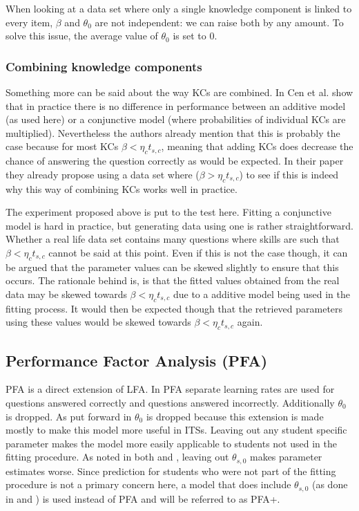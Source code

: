 \documentclass{scrartcl}
\begin{document}
When looking at a data set where only a single knowledge component is linked to every item, $\beta$ and $\theta_{0}$ are not independent: we can raise both by any amount. To solve this issue, the average value of $\theta_{0}$ is set to 0.
\subsubsection{Combining knowledge components}
\label{sec:comb}
Something more can be said about the way KCs are combined. In \cite{skillcombi} Cen et al. show that in practice there is no difference in performance between an additive model (as used here) or a conjunctive model (where probabilities of individual KCs are multiplied). Nevertheless the authors already mention that this is probably the case because for most KCs $\beta < \eta_{c} t_{s,c}$, meaning that adding KCs does decrease the chance of answering the question correctly as would be expected. In their paper they already propose using a data set where ($\beta > \eta_{c} t_{s,c}$) to see if this is indeed why this way of combining KCs works well in practice.

The experiment proposed above is put to the test here. Fitting a conjunctive model is hard in practice, but generating data using one is rather straightforward. Whether a real life data set contains many questions where skills are such that $\beta < \eta_{c} t_{s,c}$ cannot be said at this point. Even if this is not the case though, it can be argued that the parameter values can be skewed slightly to ensure that this occurs. The rationale behind is, is that the fitted values obtained from the real data may be skewed towards $\beta < \eta_{c} t_{s,c}$ due to a additive model being used in the fitting process. It would then be expected though that the retrieved parameters using these values would be skewed towards $\beta < \eta_{c} t_{s,c}$ again.

\subsection{Performance Factor Analysis (PFA)}
PFA is a direct extension of LFA. In PFA separate learning rates are used for questions answered correctly and questions answered incorrectly. Additionally $\theta_{0}$ is dropped. As put forward in \cite{pfa} $\theta_{0}$ is dropped because this extension is made mostly to make this model more useful in ITSs. Leaving out any student specific parameter makes the model more easily applicable to students not used in the fitting procedure. As noted in both \cite{ktpfa} and \cite{blackart}, leaving out $\theta_{s,0}$ makes parameter estimates worse. Since prediction for students who were not part of the fitting procedure is not a primary concern here, a model that does include $\theta_{s,0}$ (as done in \cite{ktpfa} and \cite{blackart}) is used instead of PFA and will be referred to as PFA+.
\end{document}
